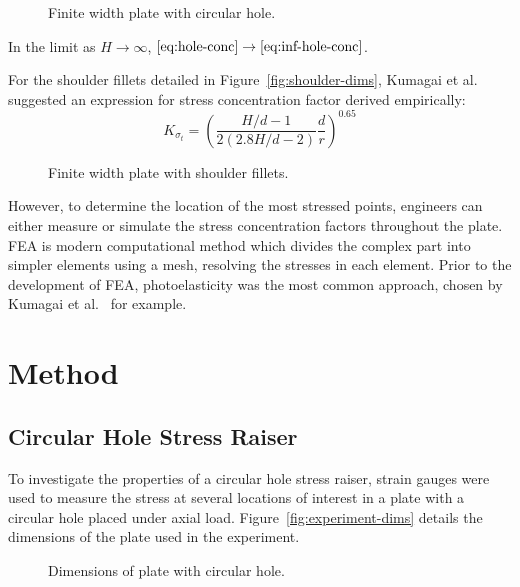 \documentclass[a4paper,11pt,twocolumn]{article}
\newcommand{\FEA}{{\sc FEA}\xspace}
\begin{document}
{\begin{figure}[h]
    \centering
    \def\svgwidth{0.48\textwidth}
    
    \caption{Finite width plate with circular hole.}
    \label{fig:hole-dims}
\end{figure}

In the limit as $H\rightarrow\infty$,
$\eqref{eq:hole-conc}\rightarrow\eqref{eq:inf-hole-conc}$.

For the shoulder fillets detailed in Figure~\vref{fig:shoulder-dims}, Kumagai et
al.~\cite{kumagai1968stress} suggested an expression for stress concentration 
factor derived empirically:
\begin{equation} \label{eq:shoulder-conc}
    K_{\sigma_t} = \left(\frac{H/d-1}{2(2.8H/d-2)}\frac{d}{r}\right)^{0.65}
\end{equation}

\begin{figure}[h]
    \centering
    \def\svgwidth{0.48\textwidth}
    
    \caption{Finite width plate with shoulder fillets.}
    \label{fig:shoulder-dims}
\end{figure}

However, to determine the location of the most stressed points, engineers can
either measure or simulate the stress concentration factors throughout the
plate. \FEA is modern computational method which divides the complex part into
simpler elements using a mesh, resolving the stresses in each element. Prior to
the development of \FEA, photoelasticity was the most common approach, chosen by
Kumagai et al.~\cite {kumagai1968stress} for example.

\section{Method}

\subsection{Circular Hole Stress Raiser}

To investigate the properties of a circular hole stress raiser, strain gauges
were used to measure the stress at several locations of interest in a plate 
with a circular hole placed under axial load. Figure~\vref{fig:experiment-dims} 
details the dimensions of the plate used in the experiment.

\begin{figure}[h]
    \centering
    \def\svgwidth{0.48\textwidth}
    
    \caption{Dimensions of plate with circular hole.}
    \label{fig:experiment-dims}
\end{figure}

}
\end{document}
